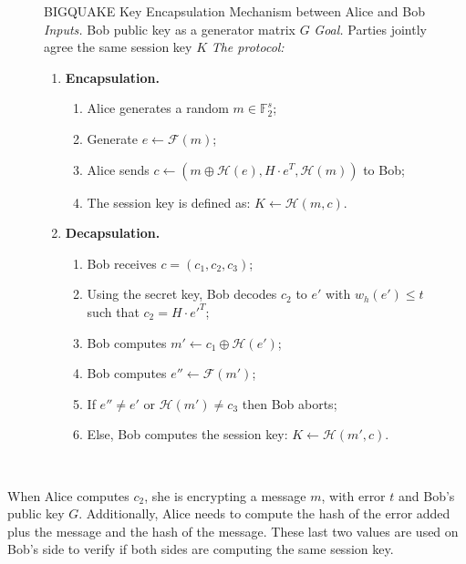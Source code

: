 \begin{figure}[ht]
\centering
\begin{protocol}{BIGQUAKE Key Encapsulation Mechanism between Alice and Bob}
    \textit{Inputs.} Bob public key as a generator matrix $G$
    \sbline
    \textit{Goal.} Parties jointly agree the same session key $K$
    \sbline
    \textit{The protocol:}
    \begin{enumerate}
      \item \textbf{Encapsulation.}
      \begin{enumerate}[label=(\alph*)]
        \item Alice generates a random $m \in \mathbb{F}^s_2$;
    
        \item Generate $e \gets \mathcal{F}(m)$;
        
        \item Alice sends $c \gets (m\oplus\mathcal{H}(e), H\cdot e^T, \mathcal{H}(m))$ to Bob;
        
        \item The session key is defined as: $K\gets \mathcal{H}(m,c)$.
      \end{enumerate}
      \item \textbf{Decapsulation.}
      \begin{enumerate}[label=(\alph*)]
        \item Bob receives $c = (c_1,c_2,c_3)$;
        \item Using the secret key, Bob decodes $c_2$ to $e'$ with $w_h(e') \leq t$ such that $c_2 = H\cdot e'^T$;
        \item Bob computes $m' \gets c_1\oplus\mathcal{H}(e')$;
        \item Bob computes $e'' \gets \mathcal{F}(m')$;
        \item If $e'' \neq e'$ or $\mathcal{H}(m') \neq c_3$ then Bob aborts;
        \item Else, Bob computes the session key: $K\gets \mathcal{H}(m',c)$.
      \end{enumerate}
    \end{enumerate}
    \\
    \hline
\end{protocol}
\end{figure}
 
When Alice computes $c_2$, she is encrypting a message $m$, with error $t$ and Bob's public key $G$. Additionally, Alice needs to compute the hash of the error added plus the message and the hash of the message. These last two values are used on Bob's side to verify if both sides are computing the same session key. 

